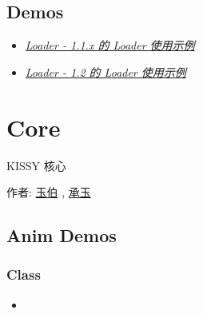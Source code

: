 \documentclass[letterpaper,10pt,english]{sphinxmanual}
\begin{document}
\subsection{Demos}
\label{demo/seed/index:demos}\begin{itemize}
\item {}
{\hyperref[demo/seed/loader/index:seed-loader-demo1]{\emph{Loader - 1.1.x 的 Loader 使用示例}}}

\item {}
{\hyperref[demo/seed/loader/index:seed-loader-demo2]{\emph{Loader - 1.2 的 Loader 使用示例}}}

\end{itemize}


\section{Core}
\label{demo/core/index:core}\label{demo/core/index:core-demo}\label{demo/core/index::doc}
\begin{DUlineblock}{0em}
\item[] KISSY 核心
\item[] 作者: \href{mailto:lifesinger@gmail.com}{玉伯} , \href{mailto:yiminghe@gmail.com}{承玉}
\end{DUlineblock}


\subsection{Anim Demos}
\label{demo/core/anim/index::doc}\label{demo/core/anim/index:anim-demos}

\subsubsection{Class}
\label{demo/core/anim/index:class}\begin{itemize}
\item {}
{\hyperref[api/core/anim/index:module-Anim]{}}

\end{itemize}
\end{document}
